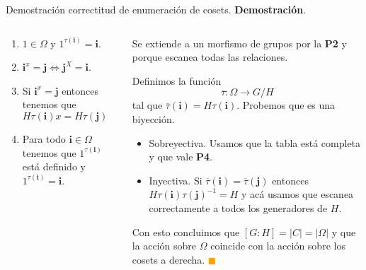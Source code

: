 \documentclass[aspectratio=169, 9pt]{beamer}
\renewcommand\qedsymbol{\textcolor{orange}{$\blacksquare$}}
\newcommand{\ol}{\overline}
\begin{document}
\begin{frame}[fragile]{Demostración correctitud de enumeración de cosets.}
	\textbf{Demostración}.  
	\begin{columns}
		\begin{column}{0.3 \textwidth}
			\begin{enumerate}
				\item $1 \in \Omega$ y $1^{\tau(\textbf{i})} = \textbf{i}$.
				
				\item $\textbf{i}^x = \textbf{j} \iff \textbf{j}^{X} = \textbf{i}$.
				
				\item Si $\textbf{i}^x = \textbf{j}$ entonces tenemos que $H \tau(\textbf{i}) x = H \tau(\textbf{j})$
				
				\item Para todo $\textbf{i} \in \Omega$ tenemos que $1^{\tau(\textbf{i})}$ está definido y $1^{\tau(\textbf{i})} = \textbf{i}$.
				\pause
			\end{enumerate}
		\end{column}
		\begin{column}{0.7 \textwidth}
			Se extiende a un morfismo de grupos por la \textbf{P2} y porque escanea todas las relaciones.	
			\pause
			
			\medskip
			Definimos la función 
			\[
			\ol \tau: \Omega \to G/H
			\]
			tal que $\ol \tau (\textbf{i}) = H \tau (\textbf{i})$.
			\pause
			Probemos que es una biyección.
			\pause
			\begin{itemize}
				\item Sobreyectiva. Usamos que la tabla está completa y que vale \textbf{P4}.
				\pause
				\item Inyectiva. Si $\ol \tau (\textbf{i}) = \ol \tau (\textbf{j})$ entonces $H \tau (\textbf{i}) \tau (\textbf{j})^{-1} = H$ y acá usamos que escanea correctamente a todos los generadores de $H$.
				\pause
			\end{itemize}
			Con esto concluimos que $[G:H] = |C| = |\Omega|$ y que la acción sobre $\Omega$ coincide con la acción sobre los cosets a derecha.	
			\qedsymbol
		\end{column}
	\end{columns}
\end{frame}
\end{document}
